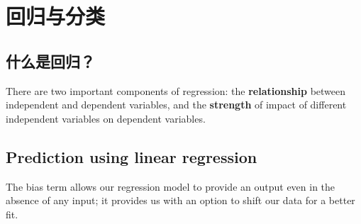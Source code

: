 \chapter{回归与分类\label{ch02}}
\section{什么是回归？}
There are two important components of regression: the \textbf{relationship} between independent and dependent variables, and the \textbf{strength} of impact of different independent variables on dependent variables.
\section{Prediction using linear regression}
The bias term allows our regression model to provide an output even in the absence of any input; it provides us with an option to shift our data for a better fit.